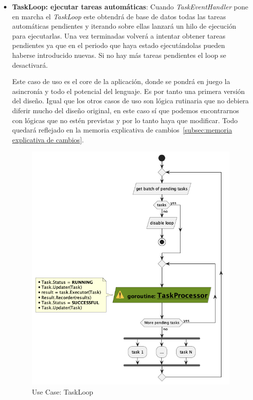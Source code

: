 \begin{itemize}
    \item \textbf{TaskLoop: ejecutar tareas automáticas}\label{ref:X}: Cuando \textit{TaskEventHandler} pone en marcha el \textit{TaskLoop} este obtendrá de base de datos todas las tareas automáticas pendientes y iterando sobre ellas lanzará un hilo de ejecución para ejecutarlas.
    Una vez terminadas volverá a intentar obtener tareas pendientes ya que en el periodo que haya estado ejecutándolas pueden haberse introducido nuevas.
    Si no hay más tareas pendientes el loop se desactivará.

    Este caso de uso es el core de la aplicación, donde se pondrá en juego la asincronía y todo el potencial del lenguaje.
    Es por tanto una primera versión del diseño.
    Igual que los otros casos de uso son lógica rutinaria que no debiera diferir mucho del diseño original, en este caso sí que podemos encontrarnos con lógicas que no estén previstas y por lo tanto haya que modificar.
    Todo quedará reflejado en la memoria explicativa de cambios~\cref{subsec:memoria explicativa de cambios}.

    \begin{figure}[H]
        \centering
        \includegraphics[height=0.4\textheight]{./part/Proyecto_ejecutivo/memoria_descriptiva/descripcionDelProyecto/manager/uml/executeTaskLoop}
        \caption{Use Case: TaskLoop}\label{fig:Use Case-TaskLoop}
    \end{figure}


\end{itemize}
